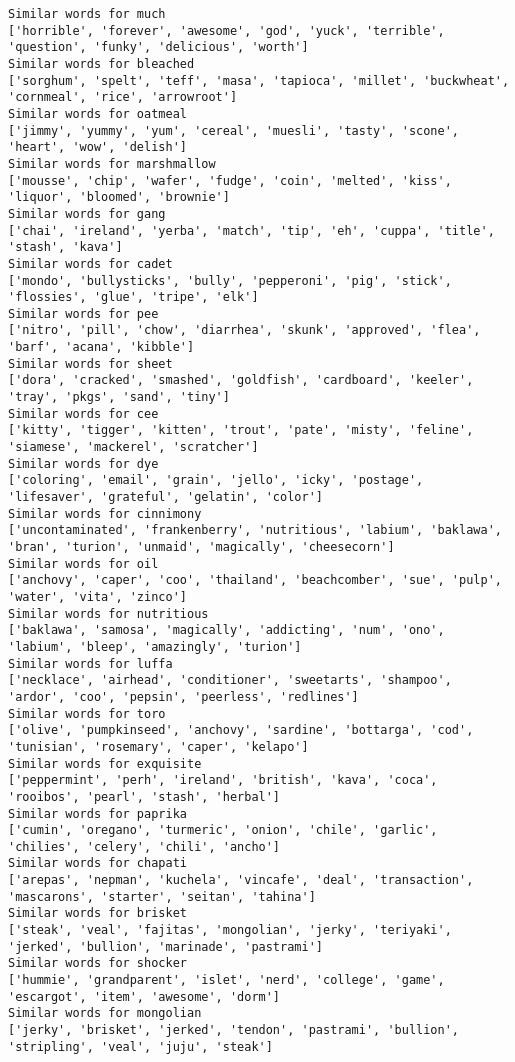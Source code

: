\documentclass[11pt]{article}
\begin{document}
\begin{Verbatim}[commandchars=\\\{\}]
Similar words for much
['horrible', 'forever', 'awesome', 'god', 'yuck', 'terrible', 'question', 'funky', 'delicious', 'worth']
Similar words for bleached
['sorghum', 'spelt', 'teff', 'masa', 'tapioca', 'millet', 'buckwheat', 'cornmeal', 'rice', 'arrowroot']
Similar words for oatmeal
['jimmy', 'yummy', 'yum', 'cereal', 'muesli', 'tasty', 'scone', 'heart', 'wow', 'delish']
Similar words for marshmallow
['mousse', 'chip', 'wafer', 'fudge', 'coin', 'melted', 'kiss', 'liquor', 'bloomed', 'brownie']
Similar words for gang
['chai', 'ireland', 'yerba', 'match', 'tip', 'eh', 'cuppa', 'title', 'stash', 'kava']
Similar words for cadet
['mondo', 'bullysticks', 'bully', 'pepperoni', 'pig', 'stick', 'flossies', 'glue', 'tripe', 'elk']
Similar words for pee
['nitro', 'pill', 'chow', 'diarrhea', 'skunk', 'approved', 'flea', 'barf', 'acana', 'kibble']
Similar words for sheet
['dora', 'cracked', 'smashed', 'goldfish', 'cardboard', 'keeler', 'tray', 'pkgs', 'sand', 'tiny']
Similar words for cee
['kitty', 'tigger', 'kitten', 'trout', 'pate', 'misty', 'feline', 'siamese', 'mackerel', 'scratcher']
Similar words for dye
['coloring', 'email', 'grain', 'jello', 'icky', 'postage', 'lifesaver', 'grateful', 'gelatin', 'color']
Similar words for cinnimony
['uncontaminated', 'frankenberry', 'nutritious', 'labium', 'baklawa', 'bran', 'turion', 'unmaid', 'magically', 'cheesecorn']
Similar words for oil
['anchovy', 'caper', 'coo', 'thailand', 'beachcomber', 'sue', 'pulp', 'water', 'vita', 'zinco']
Similar words for nutritious
['baklawa', 'samosa', 'magically', 'addicting', 'num', 'ono', 'labium', 'bleep', 'amazingly', 'turion']
Similar words for luffa
['necklace', 'airhead', 'conditioner', 'sweetarts', 'shampoo', 'ardor', 'coo', 'pepsin', 'peerless', 'redlines']
Similar words for toro
['olive', 'pumpkinseed', 'anchovy', 'sardine', 'bottarga', 'cod', 'tunisian', 'rosemary', 'caper', 'kelapo']
Similar words for exquisite
['peppermint', 'perh', 'ireland', 'british', 'kava', 'coca', 'rooibos', 'pearl', 'stash', 'herbal']
Similar words for paprika
['cumin', 'oregano', 'turmeric', 'onion', 'chile', 'garlic', 'chilies', 'celery', 'chili', 'ancho']
Similar words for chapati
['arepas', 'nepman', 'kuchela', 'vincafe', 'deal', 'transaction', 'mascarons', 'starter', 'seitan', 'tahina']
Similar words for brisket
['steak', 'veal', 'fajitas', 'mongolian', 'jerky', 'teriyaki', 'jerked', 'bullion', 'marinade', 'pastrami']
Similar words for shocker
['hummie', 'grandparent', 'islet', 'nerd', 'college', 'game', 'escargot', 'item', 'awesome', 'dorm']
Similar words for mongolian
['jerky', 'brisket', 'jerked', 'tendon', 'pastrami', 'bullion', 'stripling', 'veal', 'juju', 'steak']

\end{Verbatim}
\end{document}
